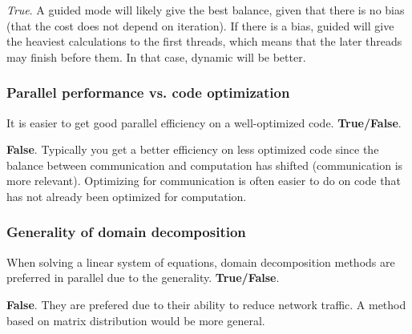 \emph{True}. A guided mode will likely give the best balance, given that there is no bias (that the cost does not depend on iteration). If there is a bias, guided will give the heaviest calculations to the first threads, which means that the later threads may finish before them. In that case, dynamic will be better.

\subsubsection{Parallel performance vs. code optimization} %
\label{ssub:parallel_performance_vs_code_optimization}


\begin{question}
  It is easier to get good parallel efficiency on a well-optimized code. \textbf{True/False}.
\end{question}

\textbf{False}. Typically you get a better efficiency on less optimized code since the balance between communication and computation has shifted (communication is more relevant). Optimizing for communication is often easier to do on code that has not already been optimized for computation.

\subsubsection{Generality of domain decomposition} %
\label{ssub:generality_of_domain_decomposition}


\begin{question}
  When solving a linear system of equations, domain decomposition methods are preferred in parallel due to the generality. \textbf{True/False}.
\end{question}

\textbf{False}. They are prefered due to their ability to reduce network traffic. A method based on matrix distribution would be more general.




